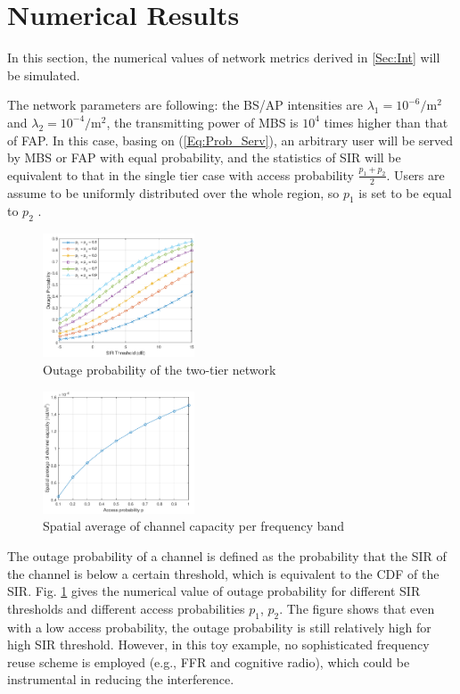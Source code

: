 \documentclass[a4paper,twocolumn]{IEEEtran}
\begin{document}
\section{Numerical Results}\label{Sec:Num}
In this section, the numerical values of network metrics derived in \ref{Sec:Int} will be simulated.

The network parameters are following: the BS/AP intensities are $\lambda_1 = 10^{-6} /\text{m}^2$ and $\lambda_2 = 10^{-4} /\text{m}^2$, the transmitting power of MBS is $10^4$ times higher than that of FAP. In this case, basing on (\ref{Eq:Prob_Serv}), an arbitrary user will be served by MBS or FAP with equal probability, and the statistics of SIR will be equivalent to that in the single tier case with access probability $\frac{p_1+p_2}{2}$. Users are assume to be uniformly distributed over the whole region, so $p_1$ is set to be equal to $p_2$  .

\begin{figure}[t]
	\centering
	\includegraphics[width = 0.4\textwidth]{figure/Outage_cropped}
	
	\caption{Outage probability of the two-tier network}
	\label{Fig:Outage}
\end{figure}

\begin{figure}[t]
	\centering
	\includegraphics[width = 0.4\textwidth]{figure/Capacity_cropped}
	
	\caption{Spatial average of channel capacity per frequency band}
	\label{Fig:Capacity}
\end{figure}

The outage probability of a channel is defined as the probability that the SIR of the channel is below a certain threshold, which is equivalent to the CDF of the SIR. Fig. \ref{Fig:Outage} gives the numerical value of outage probability for different SIR thresholds and different access probabilities $p_1$, $p_2$. The figure shows that even with a low access probability, the outage probability is still relatively high for high SIR threshold. However, in this toy example, no sophisticated frequency reuse scheme is employed (e.g., FFR and cognitive radio), which could be instrumental in reducing the interference.
\end{document}
